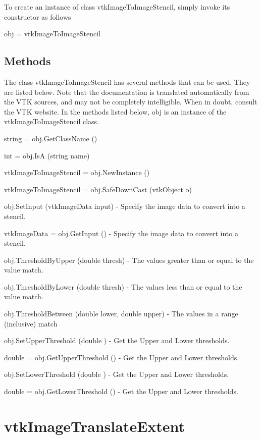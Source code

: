 To create an instance of class vtk\-Image\-To\-Image\-Stencil, simply invoke its constructor as follows \begin{DoxyVerb}  obj = vtkImageToImageStencil
\end{DoxyVerb}
 \hypertarget{vtkwidgets_vtkxyplotwidget_Methods}{}\subsection{Methods}\label{vtkwidgets_vtkxyplotwidget_Methods}
The class vtk\-Image\-To\-Image\-Stencil has several methods that can be used. They are listed below. Note that the documentation is translated automatically from the V\-T\-K sources, and may not be completely intelligible. When in doubt, consult the V\-T\-K website. In the methods listed below, {\ttfamily obj} is an instance of the vtk\-Image\-To\-Image\-Stencil class. 
\begin{DoxyItemize}
\item {\ttfamily string = obj.\-Get\-Class\-Name ()}  
\item {\ttfamily int = obj.\-Is\-A (string name)}  
\item {\ttfamily vtk\-Image\-To\-Image\-Stencil = obj.\-New\-Instance ()}  
\item {\ttfamily vtk\-Image\-To\-Image\-Stencil = obj.\-Safe\-Down\-Cast (vtk\-Object o)}  
\item {\ttfamily obj.\-Set\-Input (vtk\-Image\-Data input)} -\/ Specify the image data to convert into a stencil.  
\item {\ttfamily vtk\-Image\-Data = obj.\-Get\-Input ()} -\/ Specify the image data to convert into a stencil.  
\item {\ttfamily obj.\-Threshold\-By\-Upper (double thresh)} -\/ The values greater than or equal to the value match.  
\item {\ttfamily obj.\-Threshold\-By\-Lower (double thresh)} -\/ The values less than or equal to the value match.  
\item {\ttfamily obj.\-Threshold\-Between (double lower, double upper)} -\/ The values in a range (inclusive) match  
\item {\ttfamily obj.\-Set\-Upper\-Threshold (double )} -\/ Get the Upper and Lower thresholds.  
\item {\ttfamily double = obj.\-Get\-Upper\-Threshold ()} -\/ Get the Upper and Lower thresholds.  
\item {\ttfamily obj.\-Set\-Lower\-Threshold (double )} -\/ Get the Upper and Lower thresholds.  
\item {\ttfamily double = obj.\-Get\-Lower\-Threshold ()} -\/ Get the Upper and Lower thresholds.  
\end{DoxyItemize}\hypertarget{vtkimaging_vtkimagetranslateextent}{}\section{vtk\-Image\-Translate\-Extent}\label{vtkimaging_vtkimagetranslateextent}
